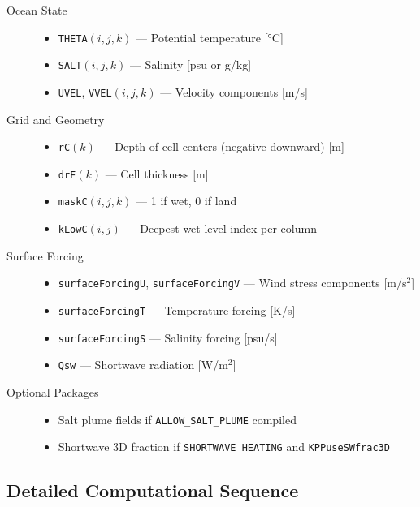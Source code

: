 \documentclass[11pt, a4paper]{article}
\begin{document}
\begin{description}
    \item[Ocean State]
    \begin{itemize}
        \item \texttt{THETA}$(i,j,k)$ — Potential temperature [°C]
        \item \texttt{SALT}$(i,j,k)$ — Salinity [psu or g/kg]
        \item \texttt{UVEL}, \texttt{VVEL}$(i,j,k)$ — Velocity components [m/s]
    \end{itemize}
    
    \item[Grid and Geometry]
    \begin{itemize}
        \item \texttt{rC}$(k)$ — Depth of cell centers (negative-downward) [m]
        \item \texttt{drF}$(k)$ — Cell thickness [m]
        \item \texttt{maskC}$(i,j,k)$ — 1 if wet, 0 if land
        \item \texttt{kLowC}$(i,j)$ — Deepest wet level index per column
    \end{itemize}
    
    \item[Surface Forcing]
    \begin{itemize}
        \item \texttt{surfaceForcingU}, \texttt{surfaceForcingV} — Wind stress components [m/s$^2$]
        \item \texttt{surfaceForcingT} — Temperature forcing [K/s]
        \item \texttt{surfaceForcingS} — Salinity forcing [psu/s]
        \item \texttt{Qsw} — Shortwave radiation [W/m$^2$]
    \end{itemize}
    
    \item[Optional Packages]
    \begin{itemize}
        \item Salt plume fields if \texttt{ALLOW\_SALT\_PLUME} compiled
        \item Shortwave 3D fraction if \texttt{SHORTWAVE\_HEATING} and \texttt{KPPuseSWfrac3D}
    \end{itemize}
\end{description}

\subsection{Detailed Computational Sequence}
\end{document}
